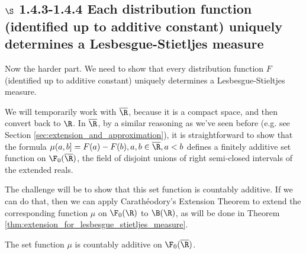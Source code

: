 \documentclass{article} %
\begin{document}
  \subsection{$\S$ 1.4.3-1.4.4 Each distribution function (identified up to additive constant) uniquely determines a Lesbesgue-Stietljes measure }
  
 Now the harder part.  We need to show that every distribution function $F$ (identified up to additive constant) uniquely determines a Lesbesgue-Stieltjes  measure.  
 
 We will temporarily work with $\overline{\R}$, because it is a compact space, and then convert back to $\R$.  In $\overline{\R}$, by a similar reasoning as we've seen before (e.g. see Section \ref{sec:extension_and_approximation}), it is straightforward to show that the formula $\mu(a,b] = F(a)-F(b), a,b \in \overline{\R}, a <b$ defines a finitely additive set function on $\F_0(\overline{\R})$, the field of disjoint unions of right semi-closed intervals of the extended reals.  
 
 The challenge will be to show that this set function is countably additive.  If we can do that, then we can apply Carath\'eodory's Extension Theorem to extend the corresponding function $\mu$ on $\F_0(\R)$ to $\B(\R)$, as will be done in Theorem \ref{thm:extension_for_lesbesgue_stietljes_measure}. 

\begin{lemma}
The set function $\mu$ is countably additive on $\F_0(\overline{\R})$.
\label{lemma:ls_measures_are_countably_additive_on_the_field_of_disjoint_rsc_intervals} 	
\end{lemma}
\end{document}
